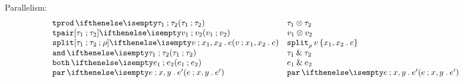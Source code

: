 \documentclass[11pt,twoside]{article}
\begin{document}
Parallelism:
\begin{displaymath}
  \begin{array}{l@{\quad}l@{\quad}l}
    \tensorty{\tau_1}{\tau_2} & \tensorty*{\tau_1}{\tau_2} \\
    \tensorex{v_1}{v_2} & \tensorex*{v_1}{v_2} \\
    \splitex{v}{x_1}{x_2}{e} & \splitex*{v}{x_1}{x_2}{e} \\
    \bothty{\tau_1}{\tau_2} & \bothty*{\tau_1}{\tau_2} \\
    \bothex{e_1}{e_2} & \bothex*{e_1}{e_2} \\
    \parex{e}{x}{y}{e'} & \parex*{e}{x}{y}{e'}
  \end{array}
\end{displaymath}
\end{document}
